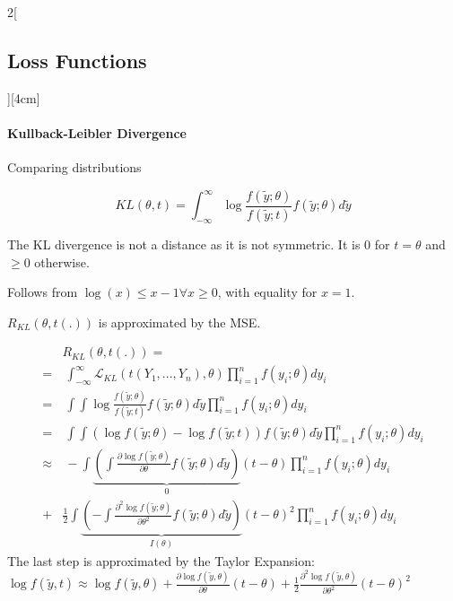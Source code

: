 \documentclass[8pt]{extarticle}
\begin{document}
\begin{multicols}{2}[\subsection{Loss Functions}][4cm]
\paragraph{Kullback-Leibler Divergence} Comparing distributions

$$KL(\theta,t) = \int_{-\infty}^\infty \log\frac{f(\tilde{y};\theta)}{f(\tilde{y};t)} f(\tilde{y};\theta) d\tilde{y}$$

\noindent The KL divergence is not a distance as it is not symmetric.
\noindent It is $0$ for $t=\theta$ and $\geq 0$ otherwise.
\begin{Proof}
Follows from $\log (x) \leq x-1 \forall x \geq 0$, with equality for $x=1$.
\end{Proof}

\noindent $R_{KL} (\theta, t(.) )$ is approximated by the MSE.
\begin{Proof}
\vspace{-1.5em}
\begin{align*}
& R_{KL} (\theta,t(.)) = \\ =&\: \int_{-\infty}^\infty \mathcal{L}_{KL}(t(Y_1,...,Y_n),\theta) \prod_{i=1}^n f(y_i;\theta)dy_i \\
=&\: \int\int \log\frac{f(\tilde{y};\theta)}{f(\tilde{y};t)} f(\tilde{y};\theta) d\tilde{y} \prod_{i=1}^n f(y_i;\theta)dy_i \\
=&\: \int\int \left(\log f(\tilde{y};\theta) - \log f(\tilde{y};t) \right) f(\tilde{y};\theta) d\tilde{y}  \prod_{i=1}^n f(y_i;\theta)dy_i \\
\approx & \: - \int \underbrace{\left( \int \frac{\partial \log f(\tilde{y};\theta)}{\partial \theta} f(\tilde{y};\theta)d\tilde{y}\right)}_{0}\left(t-\theta\right) \prod_{i=1}^n f(y_i;\theta)dy_i  \\
+ &  \frac{1}{2} \int \underbrace{\left( - \int \frac{\partial^2 \log f(\tilde{y};\theta)}{\partial \theta^2} f(\tilde{y};\theta)d\tilde{y}\right)}_{I(\theta)}\left(t-\theta\right)^2 \prod_{i=1}^n f(y_i;\theta)dy_i 
\end{align*}
The last step is approximated by the Taylor Expansion:
$\log f(\tilde{y}, t) \approx \log f(\tilde{y},\theta) {+} \frac{\partial\log f(\tilde{y}, \theta)}{\partial\theta} (t{-}\theta) {+} \frac{1}{2} \frac{\partial^2\log f(\tilde{y}, \theta)}{\partial\theta^2} (t{-}\theta)^2$
\end{Proof}
\end{multicols}
\end{document}
